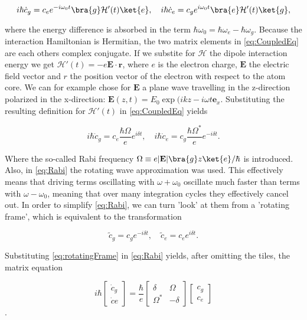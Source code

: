 \begin{equation}\label{eq:CoupledEq}
	i \hbar \dot{c}_g = c_e e^{-i \omega_0 t} \bra{g}\mathcal{H}'(t)\ket{e}, \quad i \hbar \dot{c}_e = c_g e^{i \omega_0 t} \bra{e} \mathcal{H}'(t) \ket{g},
\end{equation}

where the energy difference is absorbed in the term $\hbar \omega_0 = \hbar \omega_e - \hbar \omega_g$. Because the interaction Hamiltonian is Hermitian, the two matrix elements in \cref{eq:CoupledEq} are each others complex conjugate. If we substite for $\mathcal{H}$ the dipole interaction energy we get $\mathcal{H}'(t) = - e \mathbf{E} \cdot \mathbf{r}$, where $e$ is the electron charge, $\mathbf{E}$ the electric field vector and $r$ the position vector of the electron with respect to the atom core. We can for example chose for $\mathbf{E}$ a plane wave travelling in the z-direction polarized in the x-direction: $\mathbf{E}(z,t) = E_0 \exp{(ikz - i\omega t} \mathbf{e}_x$. Substituting the resulting definition for $\mathcal{H}'(t)$ in \cref{eq:CoupledEq} yields

\begin{equation}\label{eq:Rabi}
	i \hbar \dot{c}_g = c_e \frac{\hbar \Omega}{e} e^{i \delta t}, \quad i \hbar \dot{c}_e = c_g \frac{\hbar \Omega^*}{e} e^{-i \delta t}.
\end{equation}

Where the so-called Rabi frequency $\Omega \equiv e |\mathbf{E}| \bra{g}z\ket{e}/\hbar$ is introduced. Also, in \cref{eq:Rabi} the rotating wave approximation was used. This effectively means that driving terms oscillating with $\omega + \omega_0$ oscillate much faster than terms with $\omega - \omega_0$, meaning that over many integration cycles they effectively cancel out. In order to simplify \cref{eq:Rabi}, we can turn 'look' at them from a 'rotating frame', which is equivalent to the transformation \cite{Muldoon2012}

\begin{equation}\label{eq:rotatingFrame}
	\tilde{c}_g = c_g e^{-i \delta t}, \quad \tilde{c}_e = c_e e^{i \delta t}.
\end{equation}

Substituting \cref{eq:rotatingFrame} in \cref{eq:Rabi} yields, after omitting the tiles, the matrix equation

\begin{equation}
	i \hbar \begin{bmatrix}
		\dot{c}_g \\ 
		\dot{c}e
	\end{bmatrix}
	= \frac{\hbar}{e} \begin{bmatrix}
		\delta & \Omega \\ \Omega^* & -\delta 
	\end{bmatrix} 
	\begin{bmatrix}
		c_g \\ c_e
	\end{bmatrix}
\end{equation}.

